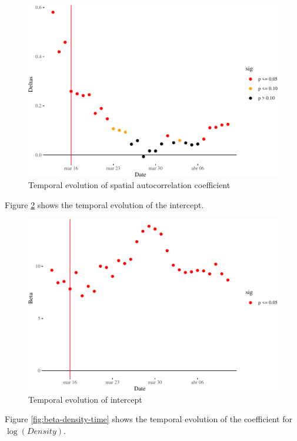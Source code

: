 \documentclass[]{elsarticle} %
\makeatletter
\def\maxwidth{\ifdim\Gin@nat@width>\linewidth\linewidth
\else\Gin@nat@width\fi}
\let\Oldincludegraphics\includegraphics
\renewcommand{\includegraphics}[1]{\Oldincludegraphics[width=\maxwidth]{#1}}
\makeatother
\begin{document}
\begin{figure}
\centering
\includegraphics{Environmental-Correlates-of-COVID19-Spain_files/figure-latex/delta-time-1.pdf}
\caption{\label{fig:delta-time}Temporal evolution of spatial
autocorrelation coefficient}
\end{figure}

Figure \ref{fig:beta-intercept-time} shows the temporal evolution of the
intercept.

\begin{figure}
\centering
\includegraphics{Environmental-Correlates-of-COVID19-Spain_files/figure-latex/beta-intercept-time-1.pdf}
\caption{\label{fig:beta-intercept-time}Temporal evolution of intercept}
\end{figure}

Figure \ref{fig:beta-density-time} shows the temporal evolution of the
coefficient for \(\log(Density)\).
\end{document}
